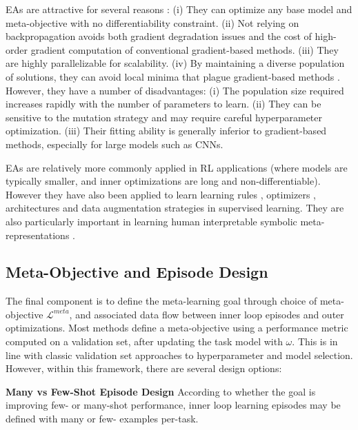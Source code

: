 \documentclass[10pt,journal,compsoc]{IEEEtran}
\newcommand{\keypoint}[1]{\vspace{0.1cm}\noindent\textbf{#1}\quad}
\begin{document}
EAs are attractive for several reasons \cite{salimans2017evolution}: (i) They can optimize any base model and meta-objective with no differentiability constraint. (ii) Not relying on backpropagation avoids both gradient degradation issues and the cost of high-order gradient computation of conventional gradient-based methods. (iii) They are highly parallelizable for scalability. (iv) By maintaining a diverse population of solutions, they can avoid local minima that plague gradient-based methods \cite{stanley2019designing}. However, they have a number of disadvantages: (i) The population size required increases rapidly with the number of parameters to learn. (ii) They can be sensitive to the mutation strategy  and may require careful hyperparameter optimization. (iii) Their fitting ability is generally inferior to gradient-based methods, especially for large models such as CNNs.

EAs are relatively more commonly applied in RL applications \cite{houthooft2018epg,song2019esmaml} (where models are typically smaller, and inner optimizations are long and non-differentiable). However they have also been applied to learn learning rules \cite{soltoggio2018born}, optimizers \cite{cao2019learning}, architectures \cite{real2018regularized,stanley2019designing} and data augmentation strategies \cite{volpi2019learnaugment} in supervised learning. They are also particularly important in learning human interpretable symbolic meta-representations \cite{gonzalez2019baikalloss}.



\subsection{Meta-Objective and Episode Design}\label{sec:why} The final component is to define the meta-learning goal through
choice of meta-objective $\mathcal{L}^{meta}$, and associated data flow between inner loop episodes and outer optimizations. Most methods define a meta-objective using a performance metric computed on a validation set, after updating the task model with $\omega$. This is in line with classic validation set approaches to hyperparameter and model selection. However, within this framework, there are several design options:

\keypoint{Many vs Few-Shot Episode Design} According to whether the goal is improving few- or many-shot performance, inner loop learning episodes may be defined with many \cite{franceschi2017hyperopt,wichrowska2017learnoptscalegen,bello2017neuraloptimizerrl} or few- \cite{finn2017maml,ravi2016optimization} examples per-task.
\end{document}
